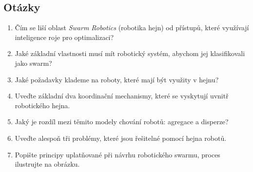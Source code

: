 \documentclass[a4paper,12pt]{article}
\begin{document}
\subsection{Otázky}
\begin{enumerate}
  \item Čím se liší oblast {\it Swarm Robotics} (robotika hejn) od přístupů, které využívají
    inteligence roje pro optimalizaci?
  \item Jaké základní vlastnosti musí mít robotický systém, abychom jej klasifikovali jako swarm?
  \item Jaké požadavky klademe na roboty, které mají být využity v hejnu?
  \item Uveďte základní dva koordinační mechanismy, které se vyskytují uvnitř robotického hejna.
  \item Jaký je rozdíl mezi těmito modely chování robotů: agregace a disperze?
  \item Uveďte alespoň tři problémy, které jsou řešitelné pomocí hejna robotů.
  \item Popište principy uplatňované při návrhu robotického swarmu, proces ilustrujte na obrázku.
\end{enumerate}


\newpage
\renewcommand{\refname}{\section{Použitá literatura}}


\end{document}
